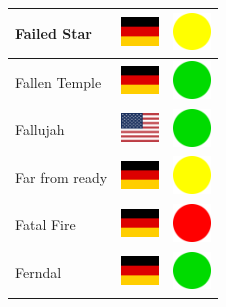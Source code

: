 \documentclass[12pt, a4paper, twoside]{report}
\begin{document}
\begin{center}
\begin{longtable}{|p{5cm}|p{2cm}|p{2cm}|}
 Failed Star                                                & \includegraphics[width=1cm]{../4x3/de} &   \includegraphics[width=1cm]{../likes/m} \\ \hline
 Fallen Temple                                              & \includegraphics[width=1cm]{../4x3/de} &   \includegraphics[width=1cm]{../likes/y} \\ \hline
 Fallujah                                                   & \includegraphics[width=1cm]{../4x3/us} &   \includegraphics[width=1cm]{../likes/y} \\ \hline
 Far from ready                                             & \includegraphics[width=1cm]{../4x3/de} &   \includegraphics[width=1cm]{../likes/m} \\ \hline
 Fatal Fire                                                 & \includegraphics[width=1cm]{../4x3/de} &   \includegraphics[width=1cm]{../likes/n} \\ \hline
 Ferndal                                                    & \includegraphics[width=1cm]{../4x3/de} &   \includegraphics[width=1cm]{../likes/y} \\ \hline

\end{longtable}
\end{center}
\end{document}
